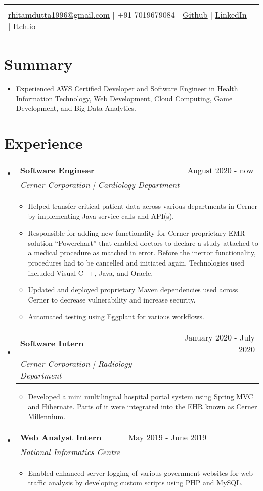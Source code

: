 \documentclass[letterpaper,11pt]{article}
\makeatletter
\newcommand{\sectionStart}{
  \begin{itemize}[label={},leftmargin=0in]
}
\newcommand{\sectionEnd}{
  \end{itemize}
}
\newcommand{\head}[7]{
  \noindent
  \begin{tabular*}{\textwidth}{l@{\extracolsep{\fill}}r}
    \centerline{
      \textbf{\href{#1}{\color{blue}{\LARGE {\underline{#2}}}}}
    }
    \vspace{5pt}\\
    \centerline{
      \href{mailto:#3}{\underline{#3}} $\mid$
      #4 $\mid$
       \href{#5}{\underline{Github}} $\mid$
       \href{#6}{\underline{LinkedIn}} $\mid$
       \href{#7}{\underline{Itch.io}}
    }
  \end{tabular*}
  \vspace{-10pt}
}
\newcommand{\summaryText}[1]{
  \item
  \begin{addmargin}[7pt]{0pt}
    {#1}
  \end{addmargin}
}
\newcommand{\jobHeading}[3]{
  \vspace{-1pt}
  \item
  \begin{tabular*}{1.0\textwidth}{l@{\extracolsep{\fill}}r@{}}
    \normalsize{\textbf{#1}} & #2 \\
    \textit{\small#3} \\
  \end{tabular*}\vspace{-5pt}
}
\newcommand{\listStart}{\begin{itemize}}
\newcommand{\listEnd}{\end{itemize}\vspace{-5pt}}
\newcommand{\bulletItem}[1]{
  \item
  \small{
    {#1 \vspace{-1.8pt}}
  }
}
\makeatother
\begin{document}
\head
  {https://rhitamdutta.com/} %
  {Rhitam Dutta} %
  {rhitamdutta1996@gmail.com} %
  {+91 7019679084} %
  {https://github.com/exthazor} %
  {https://www.linkedin.com/in/rhitam-dutta} %
  {https://www.capt-entropy.itch.io} %


\section{Summary}
\sectionStart
  \summaryText
  {Experienced AWS Certified Developer and Software Engineer in Health Information Technology, Web Development, Cloud Computing, Game Development, and Big Data Analytics.}
\sectionEnd

\section{Experience}
\sectionStart
  \jobHeading
    {Software Engineer}
    {August 2020 - now}
    {Cerner Corporation | Cardiology Department}
  \listStart
    \bulletItem
    {Helped transfer critical patient data across various departments in Cerner by implementing Java service calls and API(s).}
    \bulletItem
    {Responsible for adding new functionality for Cerner proprietary EMR solution “Powerchart” that enabled doctors to declare a study attached to a medical procedure as matched in error. Before the inerror functionality, procedures had to be cancelled and initiated again. Technologies used included Visual C++, Java, and Oracle. }
   \bulletItem
    {Updated and deployed proprietary Maven dependencies used across Cerner to decrease vulnerability and increase security.}
   \bulletItem
   {Automated testing using Eggplant for various workflows.}
   \listEnd
  \jobHeading
    {Software Intern} 
    {January 2020 - July 2020}
    {Cerner Corporation | Radiology Department}
  \listStart
    \bulletItem
    {Developed a mini multilingual hospital portal system using Spring MVC and Hibernate. Parts of it were integrated into the EHR known as Cerner Millennium.}
  \listEnd
  \jobHeading
    {Web Analyst Intern} 
    {May 2019 - June 2019}
    {National Informatics Centre}
  \listStart
    \bulletItem
    {Enabled enhanced server logging of various government websites for web traffic analysis by developing custom scripts using PHP and MySQL.}
  \listEnd
\sectionEnd

\end{document}
